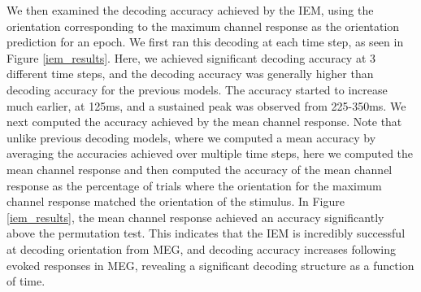 \documentclass[../main.tex]{subfiles}
\begin{document}
We then examined the decoding accuracy achieved by the IEM, using the orientation corresponding to the maximum channel response as the orientation prediction for an epoch. We first ran this decoding at each time step, as seen in Figure \ref{iem_results}. Here, we achieved significant decoding accuracy at 3 different time steps, and the decoding accuracy was generally higher than decoding accuracy for the previous models. The accuracy started to increase much earlier, at 125ms, and a sustained peak was observed from 225-350ms. We next computed the accuracy achieved by the mean channel response. Note that unlike previous decoding models, where we computed a mean accuracy by averaging the accuracies achieved over multiple time steps, here we computed the mean channel response and then computed the accuracy of the mean channel response as the percentage of trials where the orientation for the maximum channel response matched the orientation of the stimulus. In Figure \ref{iem_results}, the mean channel response achieved an accuracy significantly above the permutation test. This indicates that the IEM is incredibly successful at decoding orientation from MEG, and decoding accuracy increases following evoked responses in MEG, revealing a significant decoding structure as a function of time.
\end{document}
